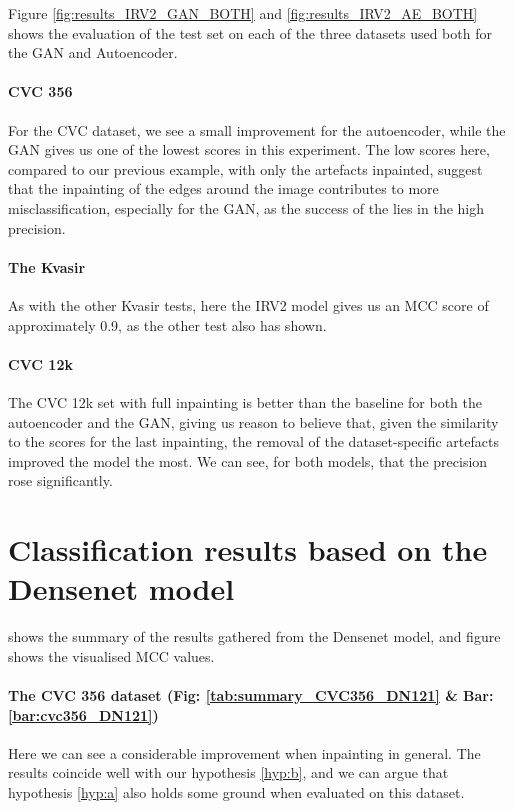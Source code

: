 \noindent Figure \ref{fig:results_IRV2_GAN_BOTH} and \ref{fig:results_IRV2_AE_BOTH} shows the evaluation of the test set on each of the three datasets used both for the GAN and Autoencoder.


\paragraph{CVC 356}
For the CVC dataset, we see a small improvement for the autoencoder, while the GAN gives us one of the lowest scores in this experiment.
The low scores here, compared to our previous example, with only the artefacts inpainted, suggest that the inpainting of the edges around the image contributes to more misclassification, especially for the GAN, as the success of the lies in the high precision. 

\paragraph{The Kvasir}
As with the other Kvasir tests, here the IRV2 model gives us an MCC score of approximately 0.9, as the other test also has shown.

\paragraph{CVC 12k}
The CVC 12k set with full inpainting is better than the baseline for both the autoencoder and the GAN, giving us reason to believe that, given the similarity to the scores for the last inpainting, the removal of the dataset-specific artefacts improved the model the most.
We can see, for both models, that the precision rose significantly.








\FloatBarrier
\section{Classification results based on the Densenet model}
 shows the summary of the results gathered from the Densenet model, and figure  shows the visualised MCC values. 

\paragraph{The CVC 356 dataset (Fig: \ref{tab:summary_CVC356_DN121} \& Bar: \ref{bar:cvc356_DN121})}
Here we can see a considerable improvement when inpainting in general. The results coincide well with our hypothesis \ref{hyp:b}, and we can argue that hypothesis \ref{hyp:a} also holds some ground when evaluated on this dataset. 

